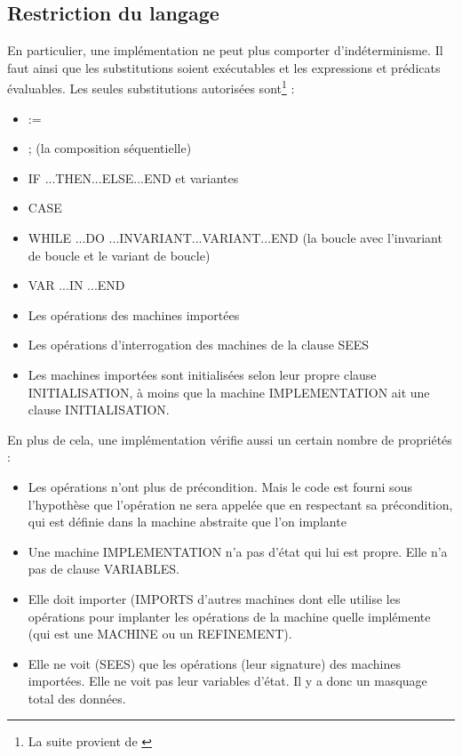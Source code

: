 \documentclass[10pt,a4paper]{article}
\begin{document}
{\subsection{Restriction du langage}

En particulier, une implémentation ne peut plus comporter d'indéterminisme. Il faut ainsi que les substitutions soient exécutables et les expressions et prédicats évaluables.
Les seules substitutions autorisées sont\footnote{La suite provient de \cite{habrias2006specifications}} :
\begin{itemize}
\item :=
\item ; (la composition séquentielle)
\item IF ...THEN...ELSE...END et variantes
\item CASE
\item WHILE ...DO ...INVARIANT...VARIANT...END (la boucle avec l'invariant de boucle et le variant de boucle)
\item VAR ...IN ...END
\item Les opérations des machines importées
\item Les opérations d'interrogation des machines de la clause SEES
\item Les machines importées sont initialisées selon leur propre clause INITIALISATION, à moins que la machine IMPLEMENTATION ait une clause INITIALISATION.
\end{itemize}

En plus de cela, une implémentation vérifie aussi un certain nombre de propriétés :
\begin{itemize}
\item Les opérations n'ont plus de précondition. Mais le code est fourni sous l'hypothèse que l'opération ne sera appelée que en respectant sa précondition, qui est définie dans la machine abstraite que l'on implante
\item Une machine IMPLEMENTATION n'a pas d'état qui lui est propre. Elle n'a pas de clause VARIABLES.
\item Elle doit importer (IMPORTS d'autres machines dont elle utilise les opérations pour implanter les opérations de la machine quelle implémente (qui est une MACHINE ou un REFINEMENT). 
\item Elle ne voit (SEES) que les opérations (leur signature) des machines importées. Elle ne voit pas leur variables d'état. Il y a donc un masquage total des données.
\end{itemize}

}
\end{document}
